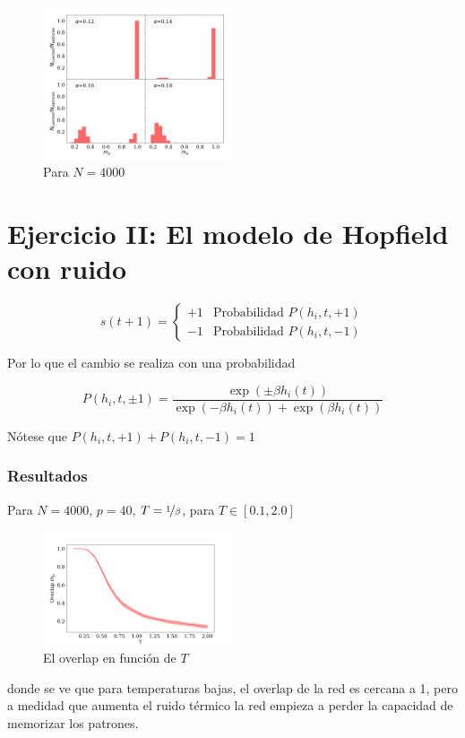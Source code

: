 \begin{figure}[H]
	\centering
	\includegraphics[width=0.5\textwidth]{../Graficos/4000.png}
	\caption{Para $N=4000$}
	\label{fig:4000}
\end{figure}


\section*{Ejercicio II: El modelo de Hopfield con ruido}

\begin{equation}
	s(t+1)=  \begin{cases} 
   +1 & \text{Probabilidad }P(h_i, t, +1) \\
   -1 & \text{Probabilidad }P(h_i, t, -1) 
\end{cases}
\end{equation}

Por lo que el cambio se realiza con una probabilidad

\begin{equation}
	P(h_i, t, \pm 1) = \frac{\exp{(\pm \beta h_i(t))}}{\exp{(- \beta h_i(t))} +\exp{(\beta h_i(t))}}
\end{equation}

Nótese que $P(h_i, t, +1) + P(h_i, t, -1) =1$

\subsubsection{Resultados}

Para $N=4000$, $p=40$, $T=\nicefrac{1}{\beta}$, para $T \in [0.1, 2.0] $

\begin{figure}[H]
	\centering
	\includegraphics[width=0.5\textwidth]{../Graficos/beta.png}
	\caption{El overlap en función de $T$}
	\label{fig:T}
\end{figure}
donde se ve que para temperaturas bajas, el overlap de la red es cercana a 1, pero a medidad que aumenta el ruido térmico la red empieza a perder la capacidad de memorizar los patrones. 



